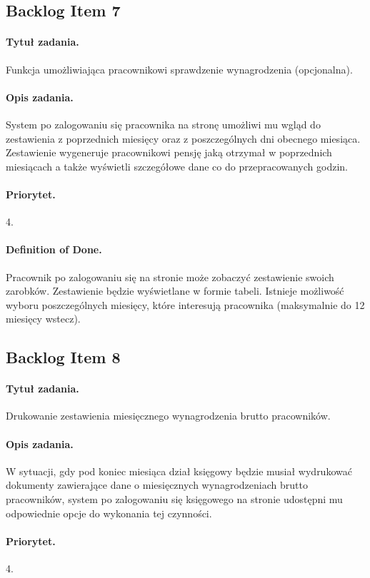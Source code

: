 \documentclass[a4paper]{article}
\begin{document}
\subsection{Backlog Item 7}
\paragraph{Tytuł zadania.} Funkcja umożliwiająca pracownikowi sprawdzenie wynagrodzenia (opcjonalna).
\paragraph{Opis zadania.} System po zalogowaniu się pracownika na stronę umożliwi mu wgląd do zestawienia z poprzednich miesięcy oraz z poszczególnych dni obecnego miesiąca. Zestawienie wygeneruje pracownikowi pensję jaką otrzymał w poprzednich miesiącach a także wyświetli szczegółowe dane co do przepracowanych godzin.
\paragraph{Priorytet.} 4.
\paragraph{Definition of Done.} Pracownik po zalogowaniu się na stronie może zobaczyć zestawienie swoich zarobków. Zestawienie będzie wyświetlane w formie tabeli. Istnieje możliwość wyboru poszczególnych miesięcy, które interesują pracownika (maksymalnie do 12 miesięcy wstecz).

\subsection{Backlog Item 8}
\paragraph{Tytuł zadania.} Drukowanie zestawienia miesięcznego wynagrodzenia brutto pracowników.
\paragraph{Opis zadania.} W sytuacji, gdy pod koniec miesiąca dział księgowy będzie musiał wydrukować dokumenty zawierające dane o miesięcznych wynagrodzeniach brutto pracowników, system po zalogowaniu się księgowego na stronie udostępni mu odpowiednie opcje do wykonania tej czynności.
\paragraph{Priorytet.} 4.
\end{document}
